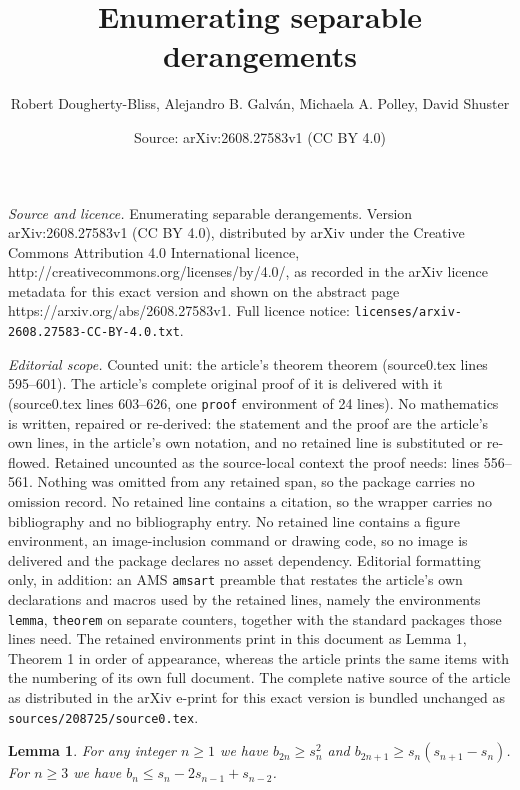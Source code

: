 \documentclass[10pt,a4paper]{amsart}
\title{Enumerating separable derangements}
\author{Robert Dougherty-Bliss, Alejandro B. Galv\'an, Michaela A. Polley, David Shuster}
\date{Source: arXiv:2608.27583v1 (CC BY 4.0)}
\newtheorem{lemma}{Lemma}
\begin{document}
\maketitle

\noindent\emph{Source and licence.} Enumerating separable derangements. Version arXiv:2608.27583v1 (CC BY 4.0), distributed by arXiv under the Creative Commons Attribution 4.0 International licence, http://creativecommons.org/licenses/by/4.0/, as recorded in the arXiv licence metadata for this exact version and shown on the abstract page https://arxiv.org/abs/2608.27583v1. Full licence notice: \texttt{licenses/arxiv-2608.27583-CC-BY-4.0.txt}.\par\smallskip

\noindent\textit{Editorial scope.} Counted unit: the article's theorem theorem (source0.tex lines 595--601). The article's complete original proof of it is delivered with it (source0.tex lines 603--626, one \texttt{proof} environment of 24 lines). No mathematics is written, repaired or re-derived: the statement and the proof are the article's own lines, in the article's own notation, and no retained line is substituted or re-flowed.  Retained uncounted as the source-local context the proof needs: lines 556--561.  Nothing was omitted from any retained span, so the package carries no omission record.  No retained line contains a citation, so the wrapper carries no bibliography and no bibliography entry.  No retained line contains a figure environment, an image-inclusion command or drawing code, so no image is delivered and the package declares no asset dependency.  Editorial formatting only, in addition: an AMS \texttt{amsart} preamble that restates the article's own declarations and macros used by the retained lines, namely the environments \texttt{lemma}, \texttt{theorem} on separate counters, together with the standard packages those lines need.  The retained environments print in this document as Lemma 1, Theorem 1 in order of appearance, whereas the article prints the same items with the numbering of its own full document.  The complete native source of the article as distributed in the arXiv e-print for this exact version is bundled unchanged as \texttt{sources/208725/source0.tex}.
\begin{lemma}
    \label{lemma:bound}
    For any integer $n \geq 1$ we have $b_{2n} \geq s_n^2$ and $b_{2n + 1} \geq
    s_n (s_{n + 1} - s_n)$. For $n \geq 3$ we have $b_n \leq s_n - 2 s_{n - 1} +
    s_{n - 2}$.
\end{lemma}
\end{document}
